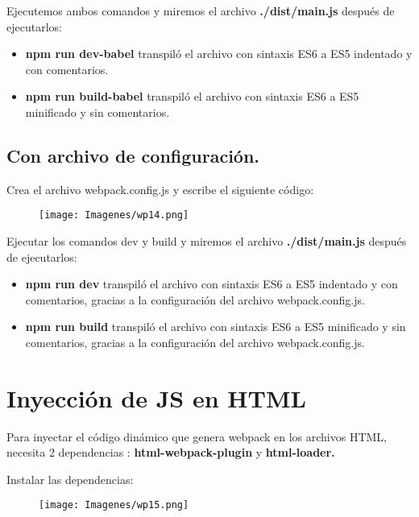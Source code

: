 \item Ejecutemos ambos comandos y miremos el archivo \textbf{./dist/main.js} después de ejecutarlos:
\begin{itemize}
    \item \textbf{npm run dev-babel} transpiló el archivo con sintaxis ES6 a ES5 indentado y con comentarios.
    \item \textbf{npm run build-babel} transpiló el archivo con sintaxis ES6 a ES5 minificado y sin comentarios.
\end{itemize}

\subsection{Con archivo de configuración.}
\item Crea el archivo webpack.config.js y escribe el siguiente código:
\begin{figure}[h]
    \centering
    \texttt{[image: Imagenes/wp14.png]}
    \label{fig:my_label}
\end{figure}

\item Ejecutar los comandos dev y build y miremos el archivo \textbf{./dist/main.js} después de ejecutarlos:

\begin{itemize}
    \item \textbf{npm run dev} transpiló el archivo con sintaxis ES6 a ES5 indentado y con comentarios, gracias a la configuración del archivo webpack.config.js.
    \item \textbf{npm run build} transpiló el archivo con sintaxis ES6 a ES5 minificado y sin comentarios, gracias a la configuración del archivo webpack.config.js.
\end{itemize}

\newpage
\section{Inyección de JS en HTML}
\item Para inyectar el código dinámico que genera webpack en los archivos HTML, necesita 2 dependencias : \textbf{html-webpack-plugin} y \textbf{html-loader.}
\item Instalar las dependencias:
\begin{figure}[h]
    \centering
    \texttt{[image: Imagenes/wp15.png]}
    \label{fig:my_label}
\end{figure}

